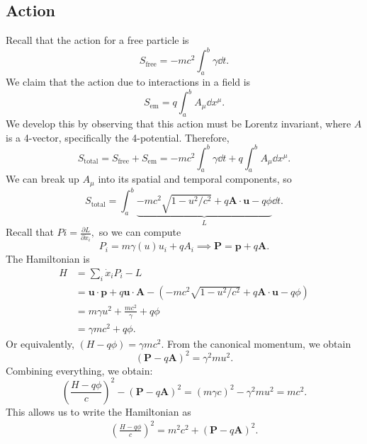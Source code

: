 \documentclass{article}
\numberwithin{equation}{section}
\begin{document}
\subsection{Action}
Recall that the action for a free particle is 
\begin{equation}
    S_\text{free} = -mc^2 \int_a^b \gamma \dd{t}.
\end{equation}
We claim that the action due to interactions in a field is 
\begin{equation}
    S_\text{em} =  q\int_a^b A_{\mu}\dd{x}^{\mu}. 
\end{equation} 
We develop this by observing that this action must be Lorentz invariant, where $A$ is a 4-vector, specifically the 4-potential. Therefore, 
\begin{equation}
    S_{\text{total}} = S_\text{free} + S_\text{em} = -mc^2 \int_a^b \gamma \dd{t} + q\int_a^b A_{\mu}\dd{x}^{\mu}.
\end{equation}
We can break up $A_\mu$ into its spatial and temporal components, so 
\begin{equation}
    S_\text{total} = \int_a^b \underbrace{-mc^2\sqrt{1-u^2/c^2} + q\bm{A}\cdot \bm{u} - q\phi}_{L} \dd{t}. 
\end{equation}
Recall that $Pi = \frac{\partial L}{\partial \dot{x}_i},$ so we can compute 
\begin{equation}
    P_i = m\gamma(u)u_i + qA_i \implies \bm{P} = \bm{p} + q\bm{A}.
\end{equation}
The Hamiltonian is 
\begin{align}
    H &= \sum_i \dot{x}_i P_i - L \\ 
    &= \bm{u}\cdot \bm{p} + q\bm{u} \cdot \bm{A} - \left(-mc^2\sqrt{1-u^2/c^2} + q\bm{A}\cdot \bm{u} - q\phi\right) \\ 
    &= m\gamma u^2 + \frac{mc^2}{\gamma} + q\phi \\ 
    &= \gamma mc^2 + q\phi.
\end{align}
Or equivalently, $(H-q\phi) = \gamma mc^2.$ From the canonical momentum, we obtain 
\begin{equation}
    \left(\bm{P}-q\bm{A}\right)^2 = \gamma^2 mu^2.
\end{equation}
Combining everything, we obtain:
\begin{equation}
    \left(\frac{H-q\phi}{c}\right)^2 - \left(\bm{P}-q\bm{A}\right)^2 = (m\gamma c)^2 - \gamma^2 mu^2 = mc^2.
\end{equation}
This allows us to write the Hamiltonian as 
\begin{align}
    \left(\frac{H-q\phi}{c}\right)^2 = m^2c^2 + \left(\bm{P} - q\bm{A}\right)^2.
\end{align}
\end{document}
